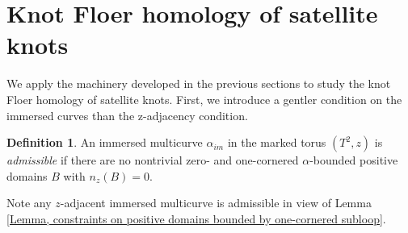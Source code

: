 \documentclass{amsart}
\theoremstyle{definition}
\newtheorem{defn}[thm]{Definition}
\theoremstyle{remark}
\numberwithin{equation}{section}
\numberwithin{equation}{section} \makeatletter
\begin{document}
\section{Knot Floer homology of satellite knots}\label{Section, satellite knot pairing}
We apply the machinery developed in the previous sections to study the knot Floer homology of satellite knots. First, we introduce a gentler condition on the immersed curves than the z-adjacency condition.
\begin{defn}\label{Definition, admissibility of immersed curves}
	An immersed multicurve $\alpha_{im}$ in the marked torus $(T^2,z)$ is \textit{admissible} if there are no nontrivial zero- and one-cornered $\alpha$-bounded positive domains $B$ with $n_z(B)=0$.   
\end{defn}
\noindent Note any $z$-adjacent immersed multicurve is admissible in view of Lemma \ref{Lemma, constraints on positive domains bounded by one-cornered subloop}.
\end{document}
